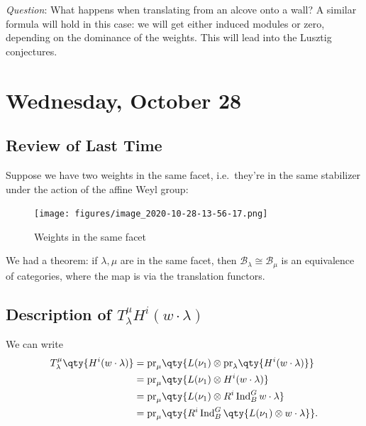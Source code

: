 \emph{Question}: What happens when translating from an alcove onto a
wall? A similar formula will hold in this case: we will get either
induced modules or zero, depending on the dominance of the weights. This
will lead into the Lusztig conjectures.

\hypertarget{wednesday-october-28}{%
\section{Wednesday, October 28}\label{wednesday-october-28}}

\hypertarget{review-of-last-time}{%
\subsection{Review of Last Time}\label{review-of-last-time}}

Suppose we have two weights in the same facet, i.e.~they're in the same
stabilizer under the action of the affine Weyl group:

\begin{figure}
\centering
\texttt{[image: figures/image\_2020-10-28-13-56-17.png]}
\caption{Weights in the same facet}
\end{figure}

We had a theorem: if \(\lambda, \mu\) are in the same facet, then
\(\mathcal{B}_\lambda \cong \mathcal{B}_\mu\) is an equivalence of
categories, where the map is via the translation functors.

\hypertarget{description-of-t_lambdamu-hiwcdot-lambda}{%
\subsection{\texorpdfstring{Description of
\(T_\lambda^\mu {H^i(w\cdot \lambda) }\)}{Description of T\_\textbackslash lambda\^{}\textbackslash mu \{H\^{}i(w\textbackslash cdot \textbackslash lambda) \}}}\label{description-of-t_lambdamu-hiwcdot-lambda}}

We can write
\begin{align*}  
T_\lambda^\mu \qty{H^i(w\cdot \lambda)} 
&= {\operatorname{pr}}_\mu \qty{L(\nu_1) \otimes{\operatorname{pr}}_\lambda\qty{H^i(w\cdot \lambda)} } \\
&= {\operatorname{pr}}_\mu \qty{L(\nu_1) \otimes{H^i(w\cdot \lambda)} } \\
&= {\operatorname{pr}}_\mu \qty{L(\nu_1) \otimes{R^i \operatorname{Ind}_B^G w\cdot \lambda} } \\
&= {\operatorname{pr}}_\mu\qty{R^i \operatorname{Ind}_B^G \qty{L(\nu_1) \otimes w\cdot \lambda } }
.\end{align*}

